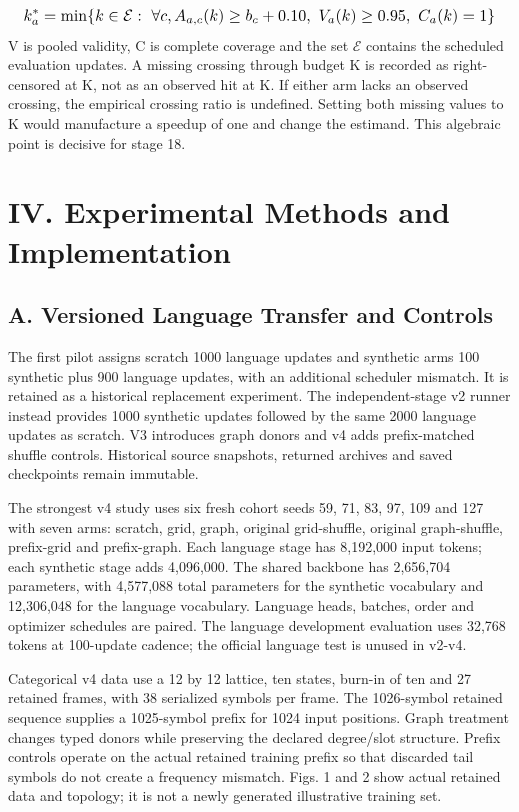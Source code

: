 \documentclass[10pt,letterpaper,twocolumn]{article}
\begin{document}
\begin{equation}
\resizebox{.98\columnwidth}{!}{$\displaystyle k_a^*=\min\{k\in\mathcal E:\ \forall c, A_{a,c}(k)\geq b_c+0.10,\ V_a(k)\geq0.95,\ C_a(k)=1\}$}
\end{equation}
V is pooled validity, C is complete coverage and the set \ensuremath{\mathcal E} contains the scheduled evaluation updates. A missing crossing through budget K is recorded as right-censored at K, not as an observed hit at K. If either arm lacks an observed crossing, the empirical crossing ratio is undefined. Setting both missing values to K would manufacture a speedup of one and change the estimand. This algebraic point is decisive for stage 18.

\section*{IV. Experimental Methods and Implementation}
\subsection*{A. Versioned Language Transfer and Controls}
The first pilot assigns scratch 1000 language updates and synthetic arms 100 synthetic plus 900 language updates, with an additional scheduler mismatch. It is retained as a historical replacement experiment. The independent-stage v2 runner instead provides 1000 synthetic updates followed by the same 2000 language updates as scratch. V3 introduces graph donors and v4 adds prefix-matched shuffle controls. Historical source snapshots, returned archives and saved checkpoints remain immutable.

The strongest v4 study uses six fresh cohort seeds 59, 71, 83, 97, 109 and 127 with seven arms: scratch, grid, graph, original grid-shuffle, original graph-shuffle, prefix-grid and prefix-graph. Each language stage has 8,192,000 input tokens; each synthetic stage adds 4,096,000. The shared backbone has 2,656,704 parameters, with 4,577,088 total parameters for the synthetic vocabulary and 12,306,048 for the language vocabulary. Language heads, batches, order and optimizer schedules are paired. The language development evaluation uses 32,768 tokens at 100-update cadence; the official language test is unused in v2-v4.

Categorical v4 data use a 12 by 12 lattice, ten states, burn-in of ten and 27 retained frames, with 38 serialized symbols per frame. The 1026-symbol retained sequence supplies a 1025-symbol prefix for 1024 input positions. Graph treatment changes typed donors while preserving the declared degree/\allowbreak{}slot structure. Prefix controls operate on the actual retained training prefix so that discarded tail symbols do not create a frequency mismatch. Figs. 1 and 2 show actual retained data and topology; it is not a newly generated illustrative training set.
\end{document}

